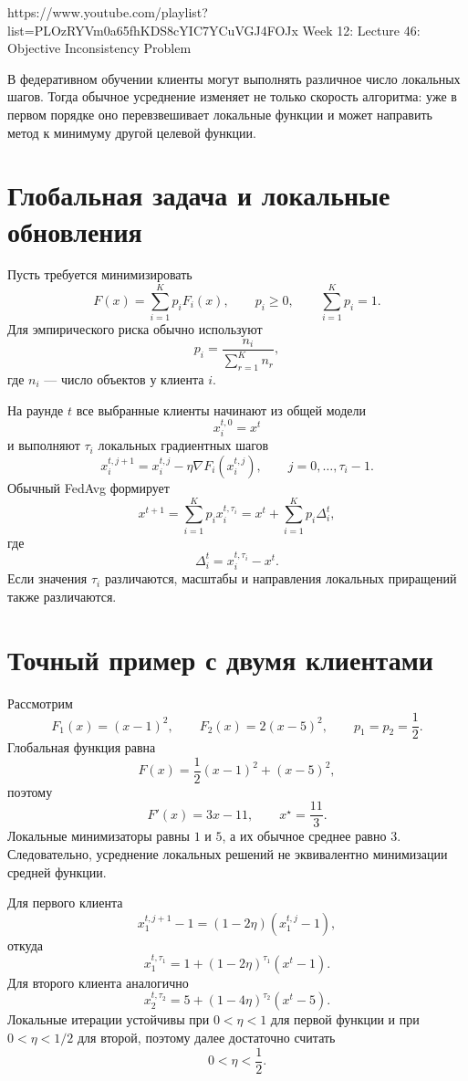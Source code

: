 
\sourcevideo
    {https://www.youtube.com/playlist?list=PLOzRYVm0a65fhKDS8cYIC7YCuVGJ4FOJx}
    {Week 12: Lecture 46: Objective Inconsistency Problem}

В федеративном обучении клиенты могут выполнять различное число
локальных шагов. Тогда обычное усреднение изменяет не только скорость
алгоритма: уже в первом порядке оно перевзвешивает локальные функции
и может направить метод к минимуму другой целевой функции.

\section{Глобальная задача и локальные обновления}

Пусть требуется минимизировать
\[
    F(x)=\sum_{i=1}^{K}p_iF_i(x),
    \qquad
    p_i\ge0,
    \qquad
    \sum_{i=1}^{K}p_i=1.
\]
Для эмпирического риска обычно используют
\[
    p_i=\frac{n_i}{\sum_{r=1}^{K}n_r},
\]
где \(n_i\) --- число объектов у клиента \(i\).

На раунде \(t\) все выбранные клиенты начинают из общей модели
\[
    x_i^{t,0}=x^t
\]
и выполняют \(\tau_i\) локальных градиентных шагов
\[
    x_i^{t,j+1}
    =
    x_i^{t,j}-\eta\nabla F_i(x_i^{t,j}),
    \qquad
    j=0,\ldots,\tau_i-1.
\]
Обычный FedAvg формирует
\[
    x^{t+1}
    =
    \sum_{i=1}^{K}p_i x_i^{t,\tau_i}
    =
    x^t+
    \sum_{i=1}^{K}p_i\Delta_i^t,
\]
где
\[
    \Delta_i^t=x_i^{t,\tau_i}-x^t.
\]
Если значения \(\tau_i\) различаются, масштабы и направления
локальных приращений также различаются.

\section{Точный пример с двумя клиентами}

Рассмотрим
\[
    F_1(x)=(x-1)^2,
    \qquad
    F_2(x)=2(x-5)^2,
    \qquad
    p_1=p_2=\frac12.
\]
Глобальная функция равна
\[
    F(x)
    =
    \frac12(x-1)^2+(x-5)^2,
\]
поэтому
\[
    F'(x)=3x-11,
    \qquad
    x^\star=\frac{11}{3}.
\]
Локальные минимизаторы равны \(1\) и \(5\), а их обычное среднее
равно \(3\). Следовательно, усреднение локальных решений не
эквивалентно минимизации средней функции.

Для первого клиента
\[
    x_1^{t,j+1}-1
    =
    (1-2\eta)(x_1^{t,j}-1),
\]
откуда
\[
    x_1^{t,\tau_1}
    =
    1+(1-2\eta)^{\tau_1}(x^t-1).
\]
Для второго клиента аналогично
\[
    x_2^{t,\tau_2}
    =
    5+(1-4\eta)^{\tau_2}(x^t-5).
\]
Локальные итерации устойчивы при \(0<\eta<1\) для первой функции и
при \(0<\eta<1/2\) для второй, поэтому далее достаточно считать
\[
    0<\eta<\frac12.
\]

